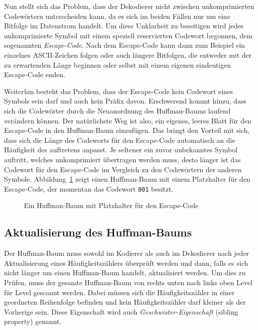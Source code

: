 \documentclass[twoside,11pt,a4paper]{article}
\theoremstyle{break}
\begin{document}
Nun stellt sich das Problem, dass der Dekodierer nicht zwischen
unkomprimierten Codewörtern unterscheiden kann, da es sich im beiden
Fällen nur um eine Bitfolge im Datenstrom handelt. Um diese Unklarheit
zu beseitigen wird jedes unkomprimierte Symbol mit einem speziell
reservierten Codewort begonnen, dem sogenannten \emph{Escape-Code}.
Nach dem Escape-Code kann dann zum Beispiel ein einzelnes
ASCII-Zeichen folgen oder auch längere Bitfolgen, die entweder mit der
zu erwartenden Länge beginnen oder selbst mit einem eigenen
eindeutigen Escape-Code enden.

Weiterhin besteht das Problem, dass der Escape-Code kein Codewort
eines Symbols sein darf und auch kein Präfix davon. Erschwerend kommt
hinzu, dass sich die Codewörter durch die Neuanordnung des
Huffman-Baums laufend verändern können. Der natürlichste Weg ist also,
ein eigenes, leeres Blatt für den Escape-Code in den Huffman-Baum
einzufügen. Das bringt den Vorteil mit sich, dass sich die Länge des
Codeworts für den Escape-Code automatisch an die Häufigkeit des
auftretens anpasst. Je seltener ein zuvor unbekanntes Symbol auftritt,
welches unkomprimiert übertragen werden muss, desto länger ist das
Codewort für den Escape-Code im Vergleich zu den Codewörtern der
anderen Symbole. Abbildung~\ref{fig:HESC} zeigt einen Huffman-Baum mit
einem Platzhalter für den Escape-Code, der momentan das Codewort
{\tt001} besitzt.

\begin{figure}[h]
\centering
{}
\caption{Ein Huffman-Baum mit Platzhalter für den Escape-Code} \label{fig:HESC}
\end{figure}

\subsection{Aktualisierung des Huffman-Baums}
Der Huffman-Baum muss sowohl im Kodierer als auch im Dekodierer nach
jeder Aktualisierung eines Häufigkeitszählers überprüft werden und
dann, falls es sich nicht länger um einen Huffman-Baum handelt,
aktualisiert werden. Um dies zu Prüfen, muss der gesamte Huffman-Baum
von rechts unten nach links oben Level für Level gescannt
werden. Dabei müssen sich die Häufigkeitszähler in einer geordneten
Reihenfolge befinden und kein Häufigkeitszähler darf kleiner als der
Vorherige sein. Diese Eigenschaft wird auch
\emph{Geschwister-Eigenschaft} (sibling property) genannt.
\end{document}
